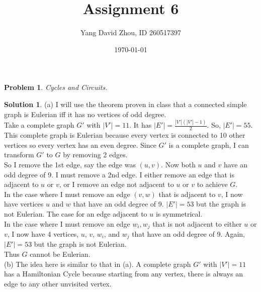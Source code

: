 \documentclass{article}
\newtheorem{problem}{Problem}
\theoremstyle{definition}
\newtheorem*{solution}{Solution}
\begin{document}
 \title{Assignment 6} 

\author{Yang David Zhou, ID 260517397} 

\date{\today}

\maketitle

\begin{problem} 

Cycles and Circuits.

\end{problem}

\begin{solution}

(a) I will use the theorem proven in class that a connected simple graph is Eulerian iff it has no vertices of odd degree.\\

Take a complete graph \(G'\) with \(|V'|=11\). It has \(|E'|=\frac{|V'|(|V'|-1)}{2}\). So, \(|E'|=55\). This complete graph is Eulerian because every vertex is connected to 10 other vertices so every vertex has an even degree. Since \(G'\) is a complete graph, I can transform \(G'\) to \(G\) by removing 2 edges. \\

So I remove the 1st edge, say the edge was \((u,v)\). Now both \(u\) and \(v\) have an odd degree of 9. I must remove a 2nd edge. I either remove an edge that is adjacent to \(u\) or \(v\), or I remove an edge not adjacent to \(u\) or \(v\) to achieve \(G\).\\

In the case where I must remove an edge \((v,w)\) that is adjacent to \(v\), I now have vertices \(u\) and \(w\) that have an odd degree of 9. \(|E'|=53\) but the graph is not Eulerian. The case for an edge adjacent to \(u\) is symmetrical.\\

In the case where I must remove an edge \(w_i,w_j\) that is not adjacent to either \(u\) or \(v\), I now have 4 vertices, \(u\), \(v\), \(w_i\), and \(w_j\) that have an odd degree of 9. Again, \(|E'|=53\) but the graph is not Eulerian. \\

Thus \(G\) cannot be Eulerian. \\

(b) The idea here is similar to that in (a). A complete graph \(G'\) with \(|V'|=11\) has a Hamiltonian Cycle because starting from any vertex, there is always an edge to any other unvisited vertex.\\


\end{solution}
\end{document}
